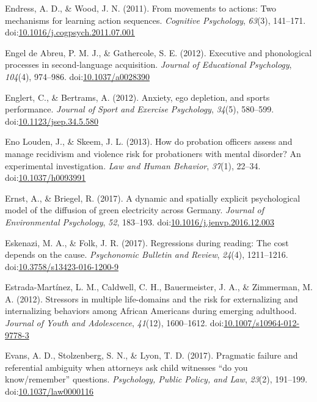 \documentclass[english,man]{apa6}
\begin{document}
\hypertarget{ref-Endress2011}{}
Endress, A. D., \& Wood, J. N. (2011). From movements to actions: Two
mechanisms for learning action sequences. \emph{Cognitive Psychology},
\emph{63}(3), 141--171.
doi:\href{https://doi.org/10.1016/j.cogpsych.2011.07.001}{10.1016/j.cogpsych.2011.07.001}

\hypertarget{ref-EngeldeAbreu2012}{}
Engel de Abreu, P. M. J., \& Gathercole, S. E. (2012). Executive and
phonological processes in second-language acquisition. \emph{Journal of
Educational Psychology}, \emph{104}(4), 974--986.
doi:\href{https://doi.org/10.1037/a0028390}{10.1037/a0028390}

\hypertarget{ref-Englert2012}{}
Englert, C., \& Bertrams, A. (2012). Anxiety, ego depletion, and sports
performance. \emph{Journal of Sport and Exercise Psychology},
\emph{34}(5), 580--599.
doi:\href{https://doi.org/10.1123/jsep.34.5.580}{10.1123/jsep.34.5.580}

\hypertarget{ref-EnoLouden2013}{}
Eno Louden, J., \& Skeem, J. L. (2013). How do probation officers assess
and manage recidivism and violence risk for probationers with mental
disorder? An experimental investigation. \emph{Law and Human Behavior},
\emph{37}(1), 22--34.
doi:\href{https://doi.org/10.1037/h0093991}{10.1037/h0093991}

\hypertarget{ref-Ernst2017}{}
Ernst, A., \& Briegel, R. (2017). A dynamic and spatially explicit
psychological model of the diffusion of green electricity across
Germany. \emph{Journal of Environmental Psychology}, \emph{52},
183--193.
doi:\href{https://doi.org/10.1016/j.jenvp.2016.12.003}{10.1016/j.jenvp.2016.12.003}

\hypertarget{ref-Eskenazi2016}{}
Eskenazi, M. A., \& Folk, J. R. (2017). Regressions during reading: The
cost depends on the cause. \emph{Psychonomic Bulletin and Review},
\emph{24}(4), 1211--1216.
doi:\href{https://doi.org/10.3758/s13423-016-1200-9}{10.3758/s13423-016-1200-9}

\hypertarget{ref-Estrada-Martinez2012}{}
Estrada-Martínez, L. M., Caldwell, C. H., Bauermeister, J. A., \&
Zimmerman, M. A. (2012). Stressors in multiple life-domains and the risk
for externalizing and internalizing behaviors among African Americans
during emerging adulthood. \emph{Journal of Youth and Adolescence},
\emph{41}(12), 1600--1612.
doi:\href{https://doi.org/10.1007/s10964-012-9778-3}{10.1007/s10964-012-9778-3}

\hypertarget{ref-Evans2017b}{}
Evans, A. D., Stolzenberg, S. N., \& Lyon, T. D. (2017). Pragmatic
failure and referential ambiguity when attorneys ask child witnesses
``do you know/remember'' questions. \emph{Psychology, Public Policy, and
Law}, \emph{23}(2), 191--199.
doi:\href{https://doi.org/10.1037/law0000116}{10.1037/law0000116}
\end{document}

